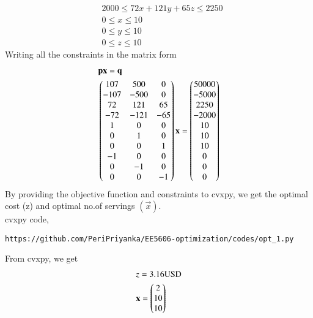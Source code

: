 \documentclass[journal,12pt,twocolumn]{IEEEtran}
\begin{document}
\begin{enumerate}
\begin{align}
&2000 \leq 72x+121y+65z \leq 2250\\
&0 \leq x \leq 10\\
&0 \leq y \leq 10\\
&0 \leq z \leq 10
\end{align}
Writing all the constraints in the matrix form
\begin{align}
&\mathbf{p}\mathbf{x} = \mathbf{q}\\
&\begin{pmatrix}107&500&0\\-107&-500&0\\72&121&65\\-72&-121&-65\\1&0&0\\0&1&0\\0&0&1\\-1&0&0\\0&-1&0\\0&0&-1\end{pmatrix}\mathbf{x}=\begin{pmatrix}50000\\ -5000\\ 2250\\ -2000\\ 10\\ 10\\ 10\\ 0\\ 0\\ 0\end{pmatrix}
\end{align}
By providing the objective function and constraints to cvxpy, we get the optimal cost (z) and optimal no.of servings $(\vec{x})$.\\
cvxpy code,
\begin{lstlisting}
https://github.com/PeriPriyanka/EE5606-optimization/codes/opt_1.py
\end{lstlisting}
From cvxpy, we get
\begin{align}
& z= 3.16  \text{USD}\\
& \mathbf{x} = \begin{pmatrix}2\\10\\10\end{pmatrix}
\end{align}
\end{enumerate}
\end{document}
